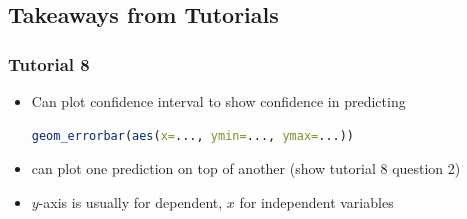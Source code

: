 \documentclass{article}
\begin{document}
\begin{multicols}{2}
\subsection{Takeaways from Tutorials}
\subsubsection{Tutorial 8}
\begin{itemize}
	\item Can plot confidence interval to show confidence in predicting
	\begin{lstlisting}[language=R]
geom_errorbar(aes(x=..., ymin=..., ymax=...))
	\end{lstlisting}
	\item can plot one prediction on top of another (show tutorial 8 question 2)
	\item $y$-axis is usually for dependent, $x$ for independent variables
\end{itemize}





\end{multicols}
\end{document}
